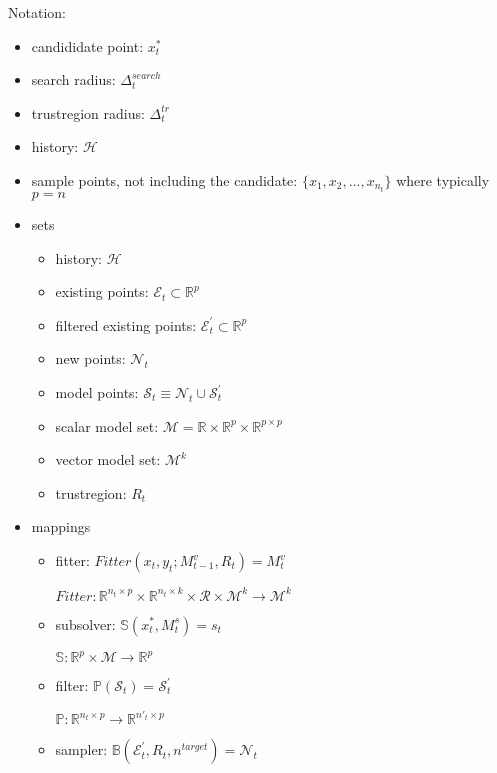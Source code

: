 Notation:
\begin{itemize}
    \item candididate point: $x^*_t$
    \item search radius: $\Delta_t^{search}$
    \item trustregion radius: $\Delta_t^{tr}$
    \item history: $\mathcal{H}$
    \item sample points, not including the candidate: $\{x_1, x_2,...,x_{n_t}\}$ where typically $p=n$
\end{itemize}

\begin{itemize}
    \item sets
        \begin{itemize}
            \item history: $\mathcal{H}$
            \item existing points: $\mathcal{E}_t\subset\mathbb{R}^{p}$
            \item filtered existing points: $\mathcal{E}^{'}_t\subset\mathbb{R}^{p}$
            \item new points: $\mathcal{N}_t$
            \item model points: $\mathcal{S}_t\equiv\mathcal{N}_t\cup\mathcal{S}^{'}_t$
            \item scalar model set: $\mathcal{M}= \mathbb{R}\times\mathbb{R}^p\times\mathbb{R}^{p\times p}$
            \item vector model set: $\mathcal{M}^k$
            \item trustregion: $R_t$

        \end{itemize}
    \item mappings
        \begin{itemize}
            \item fitter: $Fitter(x_t,y_t;M^v_{t-1},R_t)=M_{t}^v$

                    $Fitter:\mathbb{R}^{n_t\times p}\times\mathbb{R}^{n_t\times k}\times\mathcal{R}\times\mathcal{M}^k\rightarrow\mathcal{M}^k$
            \item subsolver: $\mathbb{S}(x^*_t,M^s_t)=s_t$

                    $\mathbb{S}:\mathbb{R}^{p}\times\mathcal{M}\rightarrow\mathbb{R}^p$
            \item filter: $\mathbb{P}(\mathcal{S}_t)=\mathcal{S}_t^{'}$

                        $\mathbb{P}: \mathbb{R}^{n_t\times p}\rightarrow\mathbb{R}^{n{'}_t\times p}$
            \item sampler: $\mathbb{B}(\mathcal{E}_t^{'},R_t,n^{target})=\mathcal{N}_t$
        \end{itemize}





\end{itemize}
